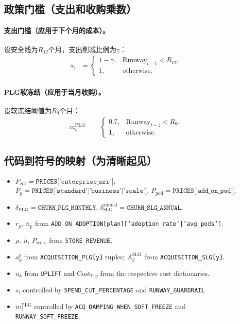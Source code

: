 \documentclass[11点, A4纸, 单面]{article}
\begin{document}
\subsection{政策门槛（支出和收购乘数）}
\paragraph{支出门槛（应用于下个月的成本）。}
设安全线为$R_{12}$个月，支出削减比例为$\gamma$：
\begin{align}
s_t 
  &= 
  \begin{cases}
    1-\gamma, & \mathrm{Runway}_{t-1} < R_{12},\\
    1, & \text{otherwise.}
  \end{cases}
\end{align}

\paragraph{PLG软冻结（应用于当月收购）。}
设软冻结阈值为$R_{9}$个月：
\begin{align}
m^{\mathrm{PLG}}_t 
  &= 
  \begin{cases}
    0.7, & \mathrm{Runway}_{t-1} < R_{9},\\
    1, & \text{otherwise.}
  \end{cases}
\end{align}

\subsection{代码到符号的映射（为清晰起见）}
\begin{itemize}
  \item $P_{\mathrm{ent}} = \texttt{PRICES['enterprise\_mrr']}$, $P_p=\texttt{PRICES['standard'|'business'|'scale']}$, $P_{\mathrm{pod}}=\texttt{PRICES['add\_on\_pod']}$.
  \item $\delta_{\mathrm{PLG}}=\texttt{CHURN\_PLG\_MONTHLY}$, $\delta^{\mathrm{annual}}_{\mathrm{SLG}}=\texttt{CHURN\_SLG\_ANNUAL}$.
  \item $r_p,\ \bar{n}_p$ from \texttt{ADD\_ON\_ADOPTION[plan]['adoption\_rate'|'avg\_pods']}.
  \item $\rho,\ \bar{u},\ P_{\mathrm{store}}$ from \texttt{STORE\_REVENUE}.
  \item $a^p_y$ from \texttt{ACQUISITION\_PLG[y]} tuples; $A^{\mathrm{SLG}}_y$ from \texttt{ACQUISITION\_SLG[y]}.
  \item $u_k$ from \texttt{UPLIFT} and $\mathrm{Cost}_{k,y}$ from the respective cost dictionaries.
  \item $s_t$ controlled by \texttt{SPEND\_CUT\_PERCENTAGE} and \texttt{RUNWAY\_GUARDRAIL}
  \item $m^{\mathrm{PLG}}_t$ controlled by \texttt{ACQ\_DAMPING\_WHEN\_SOFT\_FREEZE} and \texttt{RUNWAY\_SOFT\_FREEZE}.
\end{itemize}
\end{document}
